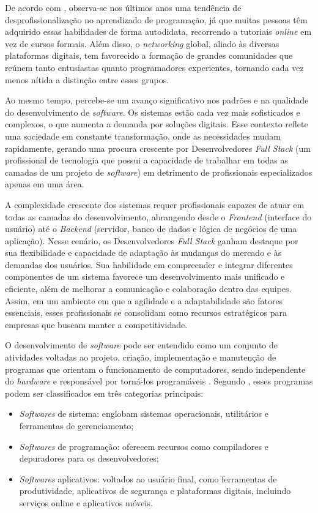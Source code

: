 \documentclass[english,brazilian]{UNISINOSartigo} %
\begin{document}
De acordo com , observa-se nos últimos anos uma tendência de desprofissionalização no aprendizado de programação, já que muitas pessoas têm adquirido essas habilidades de forma autodidata, recorrendo a tutoriais \textit{online} em vez de cursos formais. Além disso, o \textit{networking} global, aliado às diversas plataformas digitais, tem favorecido a formação de grandes comunidades que reúnem tanto entusiastas quanto programadores experientes, tornando cada vez menos nítida a distinção entre esses grupos.

Ao mesmo tempo, percebe-se um avanço significativo nos padrões e na qualidade do desenvolvimento de \textit{software}. Os sistemas estão cada vez mais sofisticados e complexos, o que aumenta a demanda por soluções digitais. Esse contexto reflete uma sociedade em constante transformação, onde as necessidades mudam rapidamente, gerando uma procura crescente por Desenvolvedores \textit{Full Stack} (um profissional de tecnologia que possui a capacidade de trabalhar em todas as camadas de um projeto de \textit{software}) em detrimento de profissionais especializados apenas em uma área.

A complexidade crescente dos sistemas requer profissionais capazes de atuar em todas as camadas do desenvolvimento, abrangendo desde o \textit{Frontend} (interface do usuário) até o \textit{Backend} (servidor, banco de dados e lógica de negócios de uma aplicação). Nesse cenário, os Desenvolvedores \textit{Full Stack} ganham destaque por sua flexibilidade e capacidade de adaptação às mudanças do mercado e às demandas dos usuários. Sua habilidade em compreender e integrar diferentes componentes de um sistema favorece um desenvolvimento mais unificado e eficiente, além de melhorar a comunicação e colaboração dentro das equipes. Assim, em um ambiente em que a agilidade e a adaptabilidade são fatores essenciais, esses profissionais se consolidam como recursos estratégicos para empresas que buscam manter a competitividade.

O desenvolvimento de \textit{software} pode ser entendido como um conjunto de atividades voltadas ao projeto, criação, implementação e manutenção de programas que orientam o funcionamento de computadores, sendo independente do \textit{hardware} e responsável por torná-los programáveis \cite{schwab2019}. Segundo , esses programas podem ser classificados em três categorias principais:

\begin{itemize}[leftmargin=1cm, itemsep=0.1em, topsep=0.1em]
    \item \textit{Softwares} de sistema: englobam sistemas operacionais, utilitários e ferramentas de gerenciamento;
    \item \textit{Softwares} de programação: oferecem recursos como compiladores e depuradores para os desenvolvedores;
    \item \textit{Softwares} aplicativos: voltados ao usuário final, como ferramentas de produtividade, aplicativos de segurança e plataformas digitais, incluindo serviços online e aplicativos móveis. 
\end{itemize}
\end{document}
